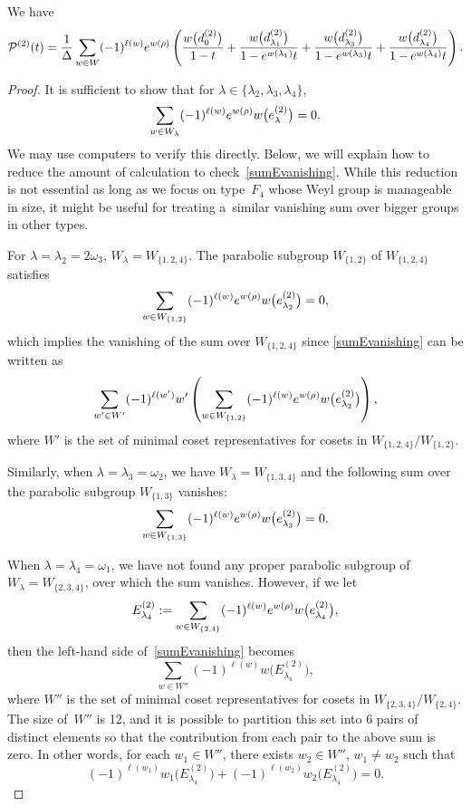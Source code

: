 \documentclass[10pt,a4paper]{amsart}
\newcommand\la{\lambda}
\begin{document}
\begin{Proposition}\label{prop:pfd}
We have
\[
\mathcal{P}^{(2)}(t) =
\frac{1}{\Delta}\sum_{w\in W}(-1)^{\ell(w)}{\rm e}^{w(\rho)}
\left(
\frac{w\bigl(d^{(2)}_{0}\bigr)}{1-t}
+\frac{w\bigl(d^{(2)}_{\la_1}\bigr)}{1-{\rm e}^{w(\la _1)}t}
+\frac{w\bigl(d^{(2)}_{\la_3}\bigr)}{1-{\rm e}^{w(\la _3)}t}
+\frac{w\bigl(d^{(2)}_{\la_4}\bigr)}{1-{\rm e}^{w(\la _4)}t}
\right).
\]
\end{Proposition}

\begin{proof}
It is sufficient to show that for $\la\in \{\la_2,\la_3,\la_4\}$,
\begin{equation}\label{sumEvanishing}
\sum_{w\in W_{\la}}(-1)^{\ell(w)}{\rm e}^{w(\rho)}w\bigl(e^{(2)}_{\la}\bigr)=0.
\end{equation}
We may use computers to verify this directly. Below, we will explain how to reduce the amount of calculation to check~\eqref{sumEvanishing}. While this reduction is not essential as long as we focus on type~$F_4$ whose Weyl group is manageable in size, it might be useful for treating a~similar vanishing sum over bigger groups in other types.

For $\la=\la_2=2\omega_3$, $W_{\la}=W_{\{1,2,4\}}$. The parabolic subgroup $W_{\{1,2\}}$ of $W_{\{1,2,4\}}$ satisfies
\[
\sum_{w\in W_{\{1,2\}}}(-1)^{\ell(w)}{\rm e}^{w(\rho)}w\bigl(e^{(2)}_{\la_2}\bigr)=0,
\]
which implies the vanishing of the sum over $W_{\{1,2,4\}}$ since
\eqref{sumEvanishing} can be written as
\[
\sum_{w'\in W'}(-1)^{\ell(w')}w'\left(\sum_{w\in W_{\{1,2\}}}(-1)^{\ell(w)}{\rm e}^{w(\rho)}w\bigl(e^{(2)}_{\la_2}\bigr)\right),
\]
where $W'$ is the set of minimal coset representatives for cosets in $W_{\{1,2,4\}}/W_{\{1,2\}}$.

Similarly, when $\la=\la_3=\omega_2$, we have $W_{\la}=W_{\{1,3,4\}}$ and the following sum over the parabolic subgroup $W_{\{1,3\}}$ vanishes:
\[
\sum_{w\in W_{\{1,3\}}}(-1)^{\ell(w)}{\rm e}^{w(\rho)}w\bigl(e^{(2)}_{\la_3}\bigr)=0.
\]

When $\la=\la_4=\omega_1$, we have not found any proper parabolic subgroup of $W_{\la}=W_{\{2,3,4\}}$, over which the sum vanishes. However, if we let
\[
E^{(2)}_{\la_4}:=\sum_{w\in W_{\{2,4\}}}(-1)^{\ell(w)}{\rm e}^{w(\rho)}w\bigl(e^{(2)}_{\la_4}\bigr),
\]
then the left-hand side of~\eqref{sumEvanishing} becomes
\[
\sum_{w\in W''}(-1)^{\ell(w)} w\bigl(E^{(2)}_{\la_4}\bigr),
\]
where $W''$ is the set of minimal coset representatives for cosets in $W_{\{2,3,4\}}/W_{\{2,4\}}$. The size of~$W''$ is 12, and it is possible to partition this set into 6 pairs of distinct elements so that the contribution from each pair to the above sum is zero. In other words, for each $w_1\in W''$, there exists $w_2\in W''$, $w_1\neq w_2$ such that
\[
(-1)^{\ell(w_1)} w_1\bigl(E^{(2)}_{\la_4}\bigr)+(-1)^{\ell(w_2)}w_2\bigl(E^{(2)}_{\la_4}\bigr)=0.\tag*{\qed}
\] \renewcommand{\qed}{}
\end{proof}
\end{document}
